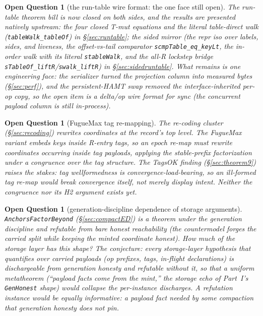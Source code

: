 \documentclass[11pt]{article}
\newtheorem{openq}[theorem]{Open Question}
\newcommand{\lean}[1]{\texttt{#1}}
\begin{document}
\begin{openq}[the run-table wire format: the one face still open]
\label{oq:runtable}
The run-table \emph{theorem} bill is now closed on both sides,
and the results are presented natively upstream: the four
closed T-mut equations and the literal table-direct walk
(\lean{tableWalk\_tableOf}) in \S\ref{sec:runtable}; the sided mirror
(the repr iso over labels, sides, and liveness, the offset-vs-tail
comparator \lean{scmpTable\_eq\_keyLt}, the in-order walk with its
literal \lean{stableWalk}, and the all-R lockstep bridge
\lean{sTableOf\_liftR}/\lean{swalk\_liftR}) in
\S\ref{sec:sidedruntable}. What remains is one engineering face: the
serializer turned the projection column into measured bytes
(\S\ref{sec:perf}), and the persistent-HAMT swap removed the
interface-inherited per-op copy, so the open item is a delta/op
\emph{wire format} for sync
(the concurrent payload column is still in-process).
\end{openq}

\begin{openq}[FugueMax tag re-mapping]
\label{oq:fmremap}
The re-coding cluster (\S\ref{sec:recoding}) rewrites coordinates at
the record's top level. The FugueMax variant embeds keys \emph{inside}
R-entry tags, so an epoch re-map must rewrite coordinates occurring
inside tag payloads, applying the stable-prefix factorization under a
congruence over the tag structure. The TagsOK finding
(\S\ref{sec:theorem9}) raises the stakes: tag wellformedness is
convergence-load-bearing, so an ill-formed tag re-map would break
convergence itself, not merely display intent. Neither the congruence
nor its H2 argument exists yet.
\end{openq}

\begin{openq}[generation-discipline dependence of storage arguments]
\label{oq:gendisc}
\lean{AnchorsFactorBeyond} (\S\ref{sec:compactED}) is a theorem under
the generation discipline and refutable from bare honest reachability
(the countermodel forges the carried split while keeping the minted
coordinate honest). How much of the storage layer has this shape? The
conjecture: every storage-layer hypothesis that quantifies over
\emph{carried payloads} (op prefixes, tags, in-flight declarations) is
dischargeable from generation honesty and refutable without it, so that
a uniform metatheorem (``payload facts come from the mint,'' the
storage echo of Part~I's \lean{GenHonest} shape) would collapse the
per-instance discharges. A refutation instance would be equally
informative: a payload fact needed by some compaction that generation
honesty does not pin.
\end{openq}
\end{document}
